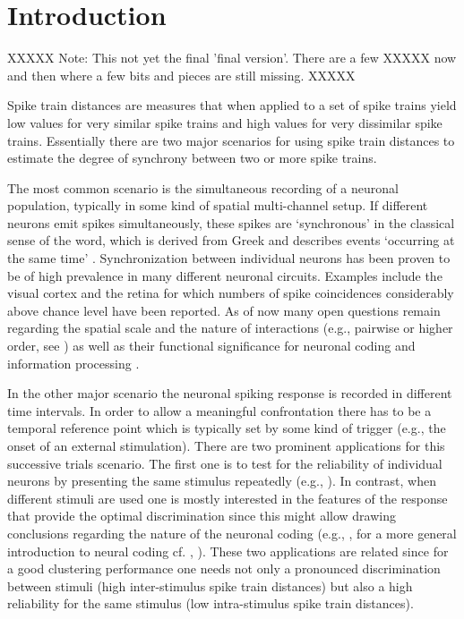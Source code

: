 \documentclass[10pt,twocolumn]{elsart5p}
\begin{document}
\section{\label{s:Intro} Introduction}

XXXXX Note: This not yet the final 'final version'. There are a few XXXXX now and then where a few bits and pieces are still missing. XXXXX

Spike train distances are measures that when applied to a set of spike trains yield low values for very similar spike trains and high values for very dissimilar spike trains. Essentially there are two major scenarios for using spike train distances to estimate the degree of synchrony between two or more spike trains.

The most common scenario is the simultaneous recording of a neuronal population, typically in some kind of spatial multi-channel setup. If different neurons emit spikes simultaneously, these spikes are `synchronous' in the classical sense of the word, which is derived from Greek and describes events `occurring at the same time' \citep{Pikovsky01}. Synchronization between individual neurons has been proven to be of high prevalence in many different neuronal circuits. Examples include the visual cortex \citep{Tiesinga08} and the retina \citep{Shlens08} for which numbers of spike coincidences considerably above chance level have been reported. As of now many open questions remain regarding the spatial scale and the nature of interactions (e.g., pairwise or higher order, see \citep{Nirenberg07}) as well as their functional significance for neuronal coding and information processing \citep{Kumar10}.

In the other major scenario the neuronal spiking response is recorded in different time intervals. In order to allow a meaningful confrontation there has to be a temporal reference point which is typically set by some kind of trigger (e.g., the onset of an external stimulation). There are two prominent applications for this successive trials scenario. The first one is to test for the reliability of individual neurons by presenting the same stimulus repeatedly (e.g., \citet{Mainen95}). In contrast, when different stimuli are used one is mostly interested in the features of the response that provide the optimal discrimination since this might allow drawing conclusions regarding the nature of the neuronal coding (e.g., \citet{Victor05}, for a more general introduction to neural coding cf. \citeauthor{QuianQuiroga02b}, \citeyear{QuianQuiroga02b}). These two applications are related since for a good clustering performance one needs not only a pronounced discrimination between stimuli (high inter-stimulus spike train distances) but also a high reliability for the same stimulus (low intra-stimulus spike train distances).
\end{document}
